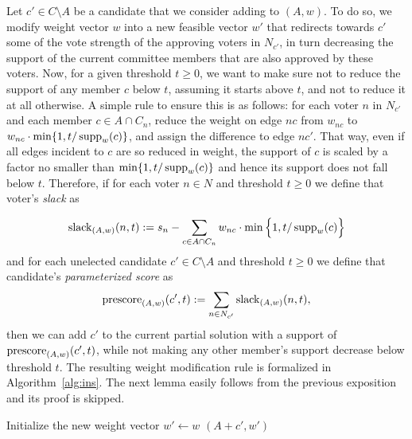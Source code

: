 Let $c'\in C\setminus A$ be a candidate that we consider adding to $(A,w)$. To do so, we modify weight vector $w$ into a new feasible vector $w'$ that redirects towards $c'$ some of the vote strength of the approving voters in $N_{c'}$, in turn decreasing the support of the current committee members that are also approved by these voters. Now, for a given threshold $t\geq 0$, we want to make sure not to reduce the support of any member $c$ below $t$, assuming it starts above $t$, and not to reduce it at all otherwise. A simple rule to ensure this is as follows: for each voter $n$ in $N_{c'}$ and each member $c\in A\cap C_n$, reduce the weight on edge $nc$ from $w_{nc}$ to $w_{nc}\cdot \min\{1, t/\operatorname{supp}_w(c)\}$, and assign the difference to edge $nc'$. That way, even if all edges incident to $c$ are so reduced in weight, the support of $c$ is scaled by a factor no smaller than $\min\{1, t/\operatorname{supp}_w(c)\}$ and hence its support does not fall below $t$.
%
Therefore, if for each voter $n\in N$ and threshold $t\geq 0$ we define that voter's \emph{slack} as

\begin{align}
    \operatorname{slack}_{(A,w)}(n,t):= s_n - \sum_{c\in A\cap C_n} w_{nc} \cdot\min \Big\{ 1, t/\operatorname{supp}_w(c)\Big\} \label{eq:slack}
\end{align}
%
and for each unelected candidate $c'\in C\setminus A$ and threshold $t\geq 0$ we define that candidate's \emph{parameterized score} as
%
\begin{equation}\label{eq:prescore}
    \operatorname{prescore}_{(A,w)}(c',t) := \sum_{n\in N_{c'}} \operatorname{slack}_{(A,w)}(n,t),
\end{equation}
%
then we can add $c'$ to the current partial solution with a support of $\operatorname{prescore}_{(A,w)}(c',t)$, while not making any other member's support decrease below threshold $t$. The resulting weight modification rule is formalized in Algorithm~\ref{alg:ins}. The next lemma easily follows from the previous exposition and its proof is skipped.

\begin{algorithm}[tb]
\SetAlgoLined
{}
Initialize the new weight vector $w'\leftarrow w$\;
\Return $(A+c',w')$\;
 \caption{$\ins(A,w,c',t)$}
\label{alg:ins}
\end{algorithm}

